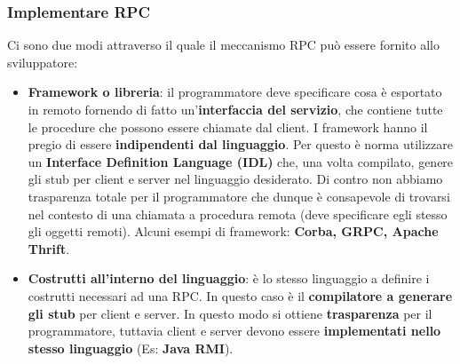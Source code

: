 \documentclass[12pt]{article}
\begin{document}
		\subsubsection{Implementare RPC}
			Ci sono due modi attraverso il quale il meccanismo RPC può essere fornito allo sviluppatore:
			\begin{itemize}
				\item \textbf{Framework o libreria}: il programmatore deve specificare cosa è esportato in remoto fornendo di fatto un'\textbf{interfaccia del servizio}, che contiene tutte le procedure che possono essere chiamate dal client. I framework hanno il pregio di essere \textbf{indipendenti dal linguaggio}. Per questo è norma utilizzare un \textbf{Interface Definition Language (IDL)} che, una volta compilato, genere gli stub per client e server nel linguaggio desiderato. Di contro non abbiamo trasparenza totale per il programmatore che dunque è consapevole di trovarsi nel contesto di una chiamata a procedura remota (deve specificare egli stesso gli oggetti remoti). Alcuni esempi di framework: \textbf{Corba, GRPC, Apache Thrift}.     
				\item \textbf{Costrutti all'interno del linguaggio}: è lo stesso linguaggio a definire i costrutti necessari ad una RPC. In questo caso è il \textbf{compilatore a generare gli stub} per client e server. In questo modo si ottiene \textbf{trasparenza} per il programmatore, tuttavia client e server devono essere \textbf{implementati nello stesso linguaggio} (Es: \textbf{Java RMI}).
			\end{itemize}
		
\end{document}
